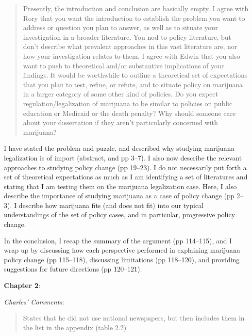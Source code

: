 \documentclass[12pt,stdletter,dateno,sigleft]{newlfm} %
\begin{document}
\begin{newlfm}
\begin{quotation}{\color{red}\noindent \footnotesize
Presently, the introduction and conclusion are basically empty. I agree with Rory that you want the introduction to establish the problem you want to address or question you plan to answer, as well as to situate your investigation in a broader literature. You nod to policy literature, but don't describe what prevalent approaches in this vast literature are, nor how your investigation relates to them. I agree with Edwin that you also want to push to theoretical and/or substantive implications of your findings. It would be worthwhile to outline a theoretical set of expectations that you plan to test, refine, or refute, and to situate policy on marijuana in a larger category of some other kind of policies. Do you expect regulation/legalization of marijuana to be similar to policies on public education or Medicaid or the death penalty? Why should someone care about your dissertation if they aren't particularly concerned with marijuana?
}
\end{quotation}

I have stated the problem and puzzle, and described why studying marijuana legalization is of import (abstract, and pp 3--7). I also now describe the relevant approaches to studying policy change (pp 19--23). I do not necessarily put forth a set of theoretical expectations as much as I am identifying a set of literatures and stating that I am testing them on the marijuana legalization case. Here, I also describe the importance of studying marijuana as a case of policy change (pp 2--3). I describe how marijuana fits (and does not fit) into our typical understandings of the set of policy cases, and in particular, progressive policy change. 

In the conclusion, I recap the summary of the argument (pp 114--115), and I wrap up by discussing how each perspective performed in explaining marijuana policy change (pp 115--118), discussing limitations (pp 118--120), and providing suggestions for future directions (pp 120--121).\newline



\textbf{Chapter 2}:

\textit{Charles' Comments}:






\begin{quotation}{\color{red}\noindent \footnotesize
States that he did not use national newspapers, but then includes them in the list in the appendix (table 2.2)
}
\end{quotation}



\end{newlfm}
\end{document}
